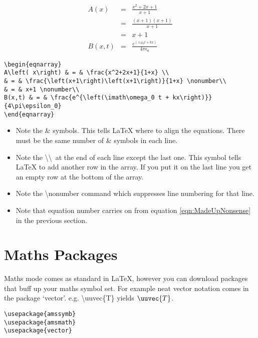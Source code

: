 \begin{eqnarray}
A\left( x\right) & = & \frac{x^2+2x+1}{x+1} \\
& = & \frac{\left(x+1\right)\left(x+1\right)}{x+1} \nonumber\\
& = & x+1 \nonumber\\
B(x,t) & = & \frac{e^{\left(\imath\omega_0 t + kx\right)}}{4\pi\epsilon_0}
\end{eqnarray}

\begin{verbatim}
\begin{eqnarray}
A\left( x\right) & = & \frac{x^2+2x+1}{1+x} \\
& = & \frac{\left(x+1\right)\left(x+1\right)}{1+x} \nonumber\\
& = & x+1 \nonumber\\
B(x,t) & = & \frac{e^{\left(\imath\omega_0 t + kx\right)}}{4\pi\epsilon_0}
\end{eqnarray}
\end{verbatim}

\begin{itemize}
\item Note the \& symbols. This tells LaTeX where to align the equations. There must be the same number of \& symbols in each line.
\item Note the \textbackslash\textbackslash ~at the end of each line except the last one. This symbol tells LaTeX to add another row in the array.  If you put it on the last line you get an empty row at the bottom of the array.
\item Note the {\textbackslash}nonumber command which suppresses line numbering for that line.
\item Note that equation number carries on from equation \ref{eqn:MadeUpNonsense} in the previous section.
\end{itemize}

\section{Maths Packages}

Maths mode comes as standard in LaTeX, however you can download packages that buff up your maths symbol set. For example neat vector notation comes in the package `vector'. e.g. {\textbackslash}uuvec\{T\} yields $\uuvec{T}$.

\begin{verbatim}
\usepackage{amssymb}
\usepackage{amsmath}
\usepackage{vector}
\end{verbatim}

